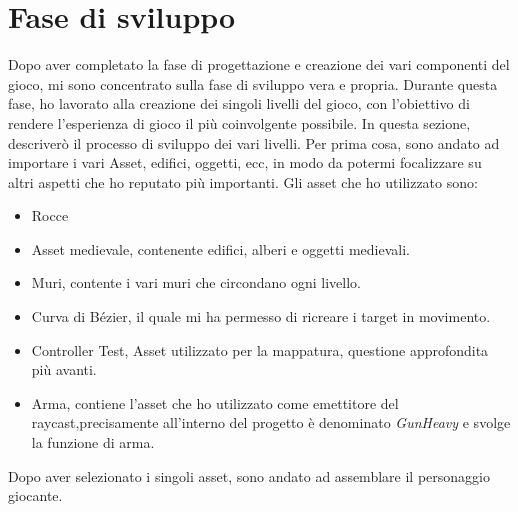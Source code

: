 \documentclass[
a4paper,
cleardoublepage=empty,
headings=twolinechapter,
numbers=autoenddot,
]{scrbook}
\begin{document}
	\section{Fase di sviluppo}
	Dopo aver completato la fase di progettazione e creazione dei vari componenti del gioco, mi sono concentrato sulla fase di sviluppo vera e propria. Durante questa fase, ho lavorato alla creazione dei singoli livelli del gioco, con l'obiettivo di rendere l'esperienza di gioco il più coinvolgente possibile. In questa sezione, descriverò il processo di sviluppo dei vari livelli.
	Per prima cosa, sono andato ad importare i vari Asset, edifici, oggetti, ecc, in modo da potermi focalizzare su altri aspetti che ho reputato più importanti.
	Gli asset che ho utilizzato sono:
	\begin{itemize}
		\item Rocce\cite{Rock_asset}
		\item Asset medievale\cite{Pack_asset}, contenente edifici, alberi e oggetti medievali. 
		\item Muri\cite{Wall_asset}, contente i vari muri che circondano ogni livello.
		\item Curva di Bézier\cite{Pack_asset}, il quale mi ha permesso di ricreare i target in movimento.
		\item Controller Test\cite{Controller_test}, Asset utilizzato per la mappatura, questione approfondita più avanti.
		\item Arma\cite{pistola}, contiene l'asset che ho utilizzato come emettitore del raycast,precisamente all'interno del progetto è denominato \textit{GunHeavy} e svolge la funzione di arma.
	\end{itemize}
	Dopo aver selezionato i singoli asset, sono andato ad assemblare il personaggio giocante.
\end{document}
